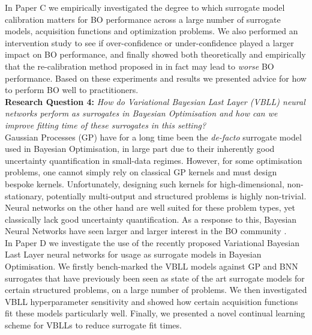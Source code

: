 \noindent In Paper C we empirically investigated the degree to which surrogate model calibration matters for BO performance across a large number of surrogate models, acquisition functions and optimization problems. We also performed an intervention study to see if over-confidence or under-confidence played a larger impact on BO performance, and finally showed both theoretically and empirically that the re-calibration method proposed in \cite{recalibration_BO} in fact may lead to \textit{worse} BO performance. Based on these experiments and results we presented advice for how to perform BO well to practitioners.\\

\noindent \textbf{Research Question 4:} \textit{How do Variational Bayesian Last Layer (VBLL) neural networks perform as surrogates in Bayesian Optimisation and how can we improve fitting time of these surrogates in this setting?} \\

\noindent Gaussian Processes (GP) have for a long time been the \textit{de-facto} surrogate model used in Bayesian Optimisation, in large part due to their inherently good uncertainty quantification in small-data regimes. However, for some optimisation problems, one cannot simply rely on classical GP kernels and must design bespoke kernels. Unfortunately, designing such kernels for high-dimensional, non-stationary, potentially multi-output and structured problems is highly non-trivial. Neural networks on the other hand are well suited for these problem types, yet classically lack good uncertainty quantification. As a response to this, Bayesian Neural Networks have seen larger and larger interest in the BO community \citep{2015_BLL, springenberg2016bayesian, li2024a}. \\

\noindent In Paper D we investigate the use of the recently proposed Variational Bayesian Last Layer neural networks \citep{2024_VBLL} for usage as surrogate models in Bayesian Optimisation. We firstly bench-marked the VBLL models against GP and BNN surrogates that have previously been seen as state of the art surrogate models for certain structured problems, on a large number of problems. We then investigated VBLL hyperparameter sensitivity and showed how certain acquisition functions fit these models particularly well. Finally, we presented a novel continual learning scheme for VBLLs to reduce surrogate fit times. \\



